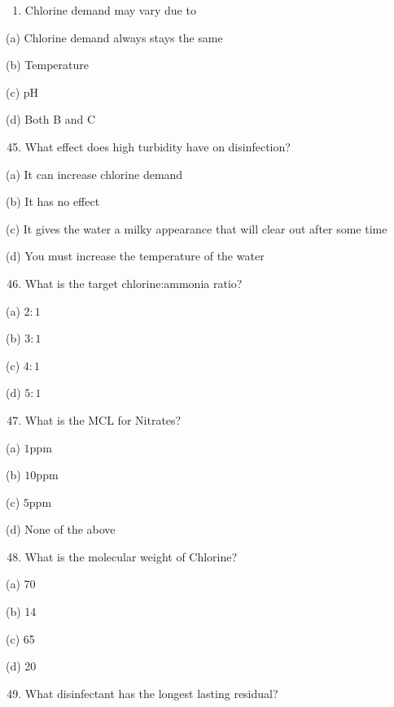 \documentclass[10pt]{article}
\begin{document}
\begin{enumerate}
\begin{enumerate}
\begin{enumerate}
  \item Chlorine demand may vary due to

\end{enumerate}

(a) Chlorine demand always stays the same

(b) Temperature

(c) $\mathrm{pH}$

(d) Both B and C

\begin{enumerate}
  \setcounter{enumi}{44}
  \item What effect does high turbidity have on disinfection?
\end{enumerate}

(a) It can increase chlorine demand

(b) It has no effect

(c) It gives the water a milky appearance that will clear out after some time

(d) You must increase the temperature of the water

\begin{enumerate}
  \setcounter{enumi}{45}
  \item What is the target chlorine:ammonia ratio?
\end{enumerate}

(a) $2: 1$

(b) $3: 1$

(c) $4: 1$

(d) $5: 1$

\begin{enumerate}
  \setcounter{enumi}{46}
  \item What is the MCL for Nitrates?
\end{enumerate}

(a) $1 \mathrm{ppm}$

(b) $10 \mathrm{ppm}$

(c) $5 \mathrm{ppm}$

(d) None of the above

\begin{enumerate}
  \setcounter{enumi}{47}
  \item What is the molecular weight of Chlorine?
\end{enumerate}

(a) 70

(b) 14

(c) 65

(d) 20

\begin{enumerate}
  \setcounter{enumi}{48}
  \item What disinfectant has the longest lasting residual?
\end{enumerate}


\end{enumerate}
\end{enumerate}
\end{document}
